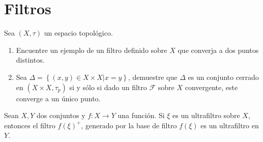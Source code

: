 \documentclass[12pt]{report}
\theoremstyle{largebreak}
\newcommand\cf[3]{\ensuremath{#1:#2\rightarrow#3}}
\begin{document}
    

    \section{Filtros}

    \begin{excer}
        Sea $(X,\tau)$ un espacio topológico.
        \begin{enumerate}
            \item Encuentre un ejemplo de un filtro definido sobre $X$ que converja a dos puntos distintos.
            \item Sea $\Delta=\left\{(x,y)\in X\times X\Big|x=y \right\}$, demuestre que $\Delta$ es un conjunto cerrado en $(X\times X,\tau_p)$ si y sólo si dado un filtro $\mathcal{F}$ sobre $X$ convergente, este converge a un único punto.
        \end{enumerate}
    \end{excer}

    \begin{excer}
        Sean $X,Y$ dos conjuntos y $\cf{f}{X}{Y}$ una función. Si $\xi$ es un ultrafiltro sobre $X$, entonces el filtro $f(\xi)^+$, generado por la base de filtro $f(\xi)$ es un ultrafiltro en $Y$.
    \end{excer}
\end{document}
